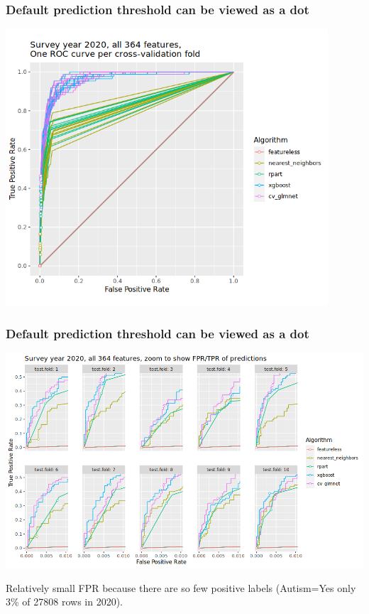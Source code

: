 \documentclass{beamer}
\begin{document}
\begin{frame}
  \frametitle{Default prediction threshold can be viewed as a dot}
  \includegraphics[width=0.9\textwidth]{download-nsch-mlr3batchmark-registry-one-set-all-features-roc-point.png}
\end{frame}

\begin{frame}
  \frametitle{Default prediction threshold can be viewed as a dot}
  \includegraphics[width=\textwidth]{download-nsch-mlr3batchmark-registry-one-set-all-features-roc-zoom.png}

  Relatively small FPR because there are so few positive labels
  (Autism=Yes only 3\% of 27808 rows in 2020).
\end{frame}
\end{document}
